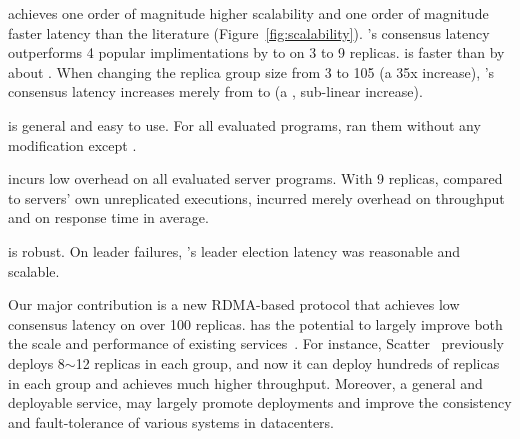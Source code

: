 \begin{tightenum}
\item \xxx achieves one order of magnitude higher scalability and one
order of magnitude faster latency than the literature 
(Figure~\ref{fig:scalability}). \xxx's consensus latency outperforms 4 
popular \paxos implimentations by \comptradlow to \comptradhigh on 3 to 
9 replicas. \xxx is faster than \dare by about \fasterDARE. When changing the 
replica group size from 3 to 105 (a 35x
increase), \xxx's consensus latency increases merely from \xxxlatencythree \us 
to
\xxxlatencyonezerofive \us (a \xxxscalability, sub-linear increase).

\item \xxx is general and easy to use. For all \nprog evaluated programs, \xxx 
ran them without any modification except \calvin.


\item \xxx incurs low overhead on all \nprog evaluated server programs.
With 9 replicas, compared to servers' own unreplicated executions, \xxx
incurred merely \tputoverhead overhead on throughput and \latencyoverhead on
response time in average.

\item \xxx is robust. On leader failures, \xxx's leader election
latency was reasonable and scalable.







\end{tightenum}

Our major contribution is a new RDMA-based \paxos protocol that achieves 
low consensus latency on over 100 replicas. \xxx has the potential to largely 
improve both the scale and performance of existing \paxos 
services~\cite{scatter:sosp11,manos:hotdep10,crane:sosp15,rex:eurosys14}. For
instance, Scatter~\cite{scatter:sosp11} previously deploys 8$\sim$12 replicas in
each \paxos group, and now it can deploy hundreds of replicas in each group and 
achieves much higher throughput. Moreover, a general and deployable service, 
\xxx may largely promote \paxos deployments and improve the 
consistency and fault-tolerance of various systems in datacenters.

